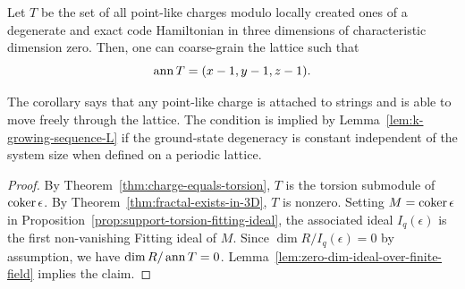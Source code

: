 \begin{cor}
Let $T$ be the set of all point-like charges modulo locally created ones
of a degenerate and exact code Hamiltonian in three dimensions
of characteristic dimension zero.
Then, one can coarse-grain the lattice such that
\[
 \mathop{\mathrm{ann}}\nolimits T = (x-1,y-1,z-1) .
\]
\label{cor:annT-3d-characteristic-dimension-0}
\end{cor}
\noindent
The corollary says that any point-like charge is attached to strings and is able to move freely through the lattice.
The condition is implied by Lemma~\ref{lem:k-growing-sequence-L} 
if the ground-state degeneracy is constant independent of the system size
when defined on a periodic lattice.
\begin{proof}
By Theorem~\ref{thm:charge-equals-torsion}, $T$ is the torsion submodule of $\mathop{\mathrm{coker}}\nolimits \epsilon$.
By Theorem~\ref{thm:fractal-exists-in-3D}, $T$ is nonzero.
Setting $M = \mathop{\mathrm{coker}}\nolimits \epsilon$ in Proposition~\ref{prop:support-torsion-fitting-ideal},
the associated ideal $I_q(\epsilon)$ is the first non-vanishing Fitting ideal of $M$.
Since $\dim R / I_q(\epsilon) = 0$ by assumption, we have $\dim R / \mathop{\mathrm{ann}}\nolimits T = 0$.
Lemma~\ref{lem:zero-dim-ideal-over-finite-field} implies the claim.
\end{proof}


